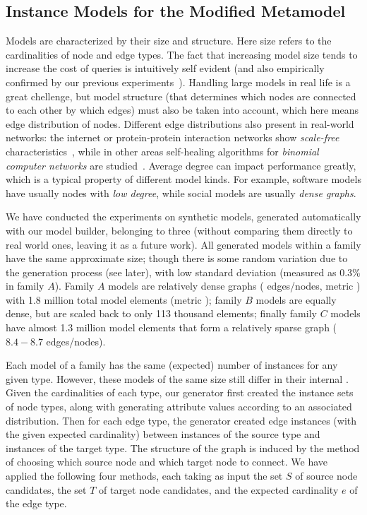 \subsection{Instance Models for the Modified Metamodel}
\label{sec:benchmark-models}

Models are characterized by their size and structure. Here size refers to the cardinalities of node and edge types. The fact that increasing model size tends to increase the cost of queries is intuitively self evident (and also empirically confirmed \eg by our previous experiments~\cite{icgt08-bhrv,models10}). Handling large models in real life is a great chellenge, but model structure (that determines which nodes are connected to each other by which edges) must also be taken into account, which here means edge distribution of nodes. Different edge distributions also present in real-world networks: the internet or protein-protein interaction networks show \emph{scale-free} characteristics~\cite{barabasi_network_2004}, while in other areas self-healing algorithms for \emph{binomial computer networks} are studied~\cite{binomial-self-healing}. Average degree can impact performance greatly, which is a typical property of different model kinds. For example, software models have usually nodes with \emph{low degree}, while social models are usually \emph{dense graphs}. 

We have conducted the experiments on synthetic models, generated automatically
with our model builder, belonging to three   (without
comparing them directly to real world ones, leaving it as a future work). All
generated models within a family have the same approximate size; though there is
some random variation due to the generation process (see later), with low
standard deviation (\eg measured as 0.3\% in family $A$).  Family $A$ models are relatively dense graphs
( edges/nodes, \ie metric ) with 1.8 million
total model elements (metric ); family $B$ models are equally
dense, but are scaled back to only 113 thousand elements; finally family $C$
models have almost 1.3 million model elements that form a relatively sparse
graph ($8.4-8.7$ edges/nodes).

Each model of a family has the same (expected) number of instances for any given
type. However, these models of the same size still differ in their internal
. Given the cardinalities of each type, our generator first
created the instance sets of node types, along with generating attribute values
according to an associated distribution. Then for each edge type, the generator
created edge instances (with the given expected cardinality) between instances
of the source type and instances of the target type. The structure of the graph
is induced by the method of choosing which source node and which target node to
connect. We have applied the following four methods, each taking as input the
set $S$ of source node candidates, the set $T$ of target node candidates, and
the expected cardinality $e$ of the edge type. %

